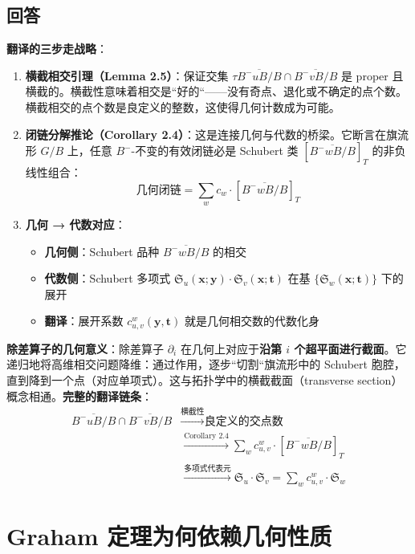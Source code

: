 \subsection{回答}
\textbf{翻译的三步走战略}：
\begin{enumerate}
\item \textbf{横截相交引理（Lemma 2.5）}：保证交集 $\tau \overline{B^-uB/B} \cap \overline{B^-vB/B}$ 是 proper 且横截的。横截性意味着相交是``好的``——没有奇点、退化或不确定的点个数。横截相交的点个数是良定义的整数，这使得几何计数成为可能。\item \textbf{闭链分解推论（Corollary 2.4）}：这是连接几何与代数的桥梁。它断言在旗流形 $G/B$ 上，任意 $B^-$-不变的有效闭链必是 Schubert 类 $[\overline{B^-wB/B}]_T$ 的非负线性组合：$$\text{几何闭链} = \sum_w c_w \cdot [\overline{B^-wB/B}]_T$$\item \textbf{几何 → 代数对应}：
\begin{itemize}
\item \textbf{几何侧}：Schubert 品种 $\overline{B^-wB/B}$ 的相交
\item \textbf{代数侧}：Schubert 多项式 $\mathfrak{S}_u(\mathbf{x};\mathbf{y}) \cdot \mathfrak{S}_v(\mathbf{x};\mathbf{t})$ 在基 $\{\mathfrak{S}_w(\mathbf{x};\mathbf{t})\}$ 下的展开
\item \textbf{翻译}：展开系数 $c^w_{u,v}(\mathbf{y},\mathbf{t})$ 就是几何相交数的代数化身
\end{itemize}
\end{enumerate}

\textbf{除差算子的几何意义}：除差算子 $\partial_i$ 在几何上对应于\textbf{沿第 $i$ 个超平面进行截面}。它递归地将高维相交问题降维：通过作用，逐步``切割``旗流形中的 Schubert 胞腔，直到降到一个点（对应单项式）。这与拓扑学中的横截截面（transverse section）概念相通。\textbf{完整的翻译链条}：
\begin{align}\overline{B^-uB/B} \cap \overline{B^-vB/B}&\xrightarrow{\text{横截性}} \text{良定义的交点数} \label{eq:geometric-to-integer} \\&\xrightarrow{\text{Corollary 2.4}} \sum_w c^w_{u,v} \cdot [\overline{B^-wB/B}]_T \label{eq:integer-to-cohomology} \\&\xrightarrow{\text{多项式代表元}} \mathfrak{S}_u \cdot \mathfrak{S}_v = \sum_w c^w_{u,v} \cdot \mathfrak{S}_w \label{eq:cohomology-to-polynomial}
\end{align}
\section{Graham 定理为何依赖几何性质}\label{sec:GrahamProofGeometry}
